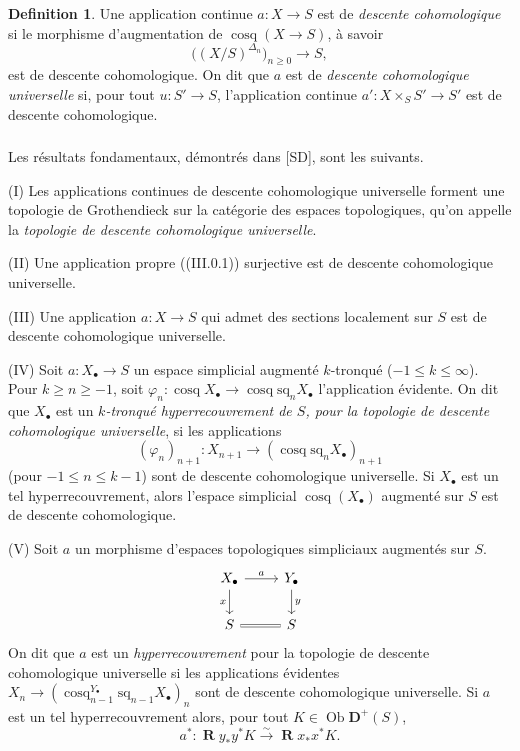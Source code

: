 \documentclass[11pt]{amsart}
\theoremstyle{plain}
\theoremstyle{definition}
\newtheorem{definition}[theorem]{Definition}
\DeclareMathOperator{\Rd}{\mathbf{R}}
\DeclareMathOperator{\cosq}{cosq}
\DeclareMathOperator{\Ob}{Ob}
\newcommand{\DD}{\mathbf{D}}
\begin{document}
\subsubsection{}
\begin{definition}
Une application continue $a : X \to S$ est de \emph{descente cohomologique} si le morphisme d'augmentation de $\cosq(X \to S)$, \`a savoir
\[
\big((X/S)^{\Delta_n}\big)_{n \geq 0} \to S,
\]
est de descente cohomologique. On dit que $a$ est de \emph{descente cohomologique universelle} si, pour tout $u : S' \to S$, l'application continue $a' : X \times_S S' \to S'$ est de descente cohomologique.
\end{definition}

\subsubsection{}
Les r\'esultats fondamentaux, d\'emontr\'es dans [SD], sont les suivants.

(I) Les applications continues de descente cohomologique universelle forment une topologie de Grothendieck sur la cat\'egorie des espaces topologiques, qu'on appelle la \emph{topologie de descente cohomologique universelle}.

(II) Une application propre ((III.0.1)) surjective est de descente cohomologique universelle.

(III) Une application $a : X \to S$ qui admet des sections localement sur $S$ est de descente cohomologique universelle.

(IV) Soit $a : X_\bullet \to S$ un espace simplicial augment\'e $k$-tronqu\'e ($-1 \leq k \leq \infty$). Pour $k \geq n \geq -1$, soit $\varphi_n : \cosq X_\bullet \to \cosq \mathrm{sq}_n X_\bullet$ l'application \'evidente. On dit que $X_\bullet$ est un \emph{$k$-tronqu\'e hyperrecouvrement de $S$, pour la topologie de descente cohomologique universelle}, si les applications
\begin{equation}\label{eq:5.3.5.1}
(\varphi_n)_{n+1} : X_{n+1} \to (\cosq \mathrm{sq}_n X_\bullet)_{n+1}
\end{equation}
(pour $-1 \leq n \leq k-1$) sont de descente cohomologique universelle. Si $X_\bullet$ est un tel hyperrecouvrement, alors l'espace simplicial $\cosq(X_\bullet)$ augment\'e sur $S$ est de descente cohomologique.

(V) Soit $a$ un morphisme d'espaces topologiques simpliciaux augment\'es sur $S$.
\[
\begin{tikzcd}
X_\bullet \arrow[r, "a"] \arrow[d, "x"'] & Y_\bullet \arrow[d, "y"] \\
S \arrow[r, equal] & S
\end{tikzcd}
\]
On dit que $a$ est un \emph{hyperrecouvrement} pour la topologie de descente cohomologique universelle si les applications \'evidentes $X_n \to (\cosq_{n-1}^{Y_\bullet} \mathrm{sq}_{n-1} X_\bullet)_n$ sont de descente cohomologique universelle. Si $a$ est un tel hyperrecouvrement alors, pour tout $K \in \Ob \DD^+(S)$,
\[
a^* : \Rd y_* y^* K \xrightarrow{\sim} \Rd x_* x^* K.
\]
\end{document}
